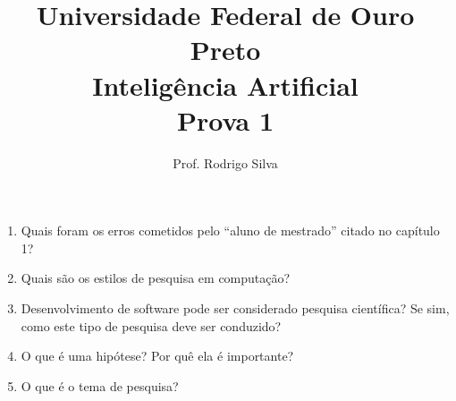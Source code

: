 \documentclass{article}
\title{\vspace{-2 cm}Universidade Federal de Ouro Preto \\ Inteligência Artificial \\ Prova 1}
\author{Prof. Rodrigo Silva}
\date{}
\begin{document}
\maketitle

\begin{enumerate}

\item Quais foram os erros cometidos pelo ``aluno de mestrado'' citado no capítulo 1?

\item Quais são os estilos de pesquisa em computação?

\item Desenvolvimento de software pode ser considerado pesquisa científica? Se sim, como este tipo de pesquisa deve ser conduzido?

\item O que é uma hipótese? Por quê ela é importante?

\item O que é o tema de pesquisa?

\end{enumerate}


%
%
\end{document}
